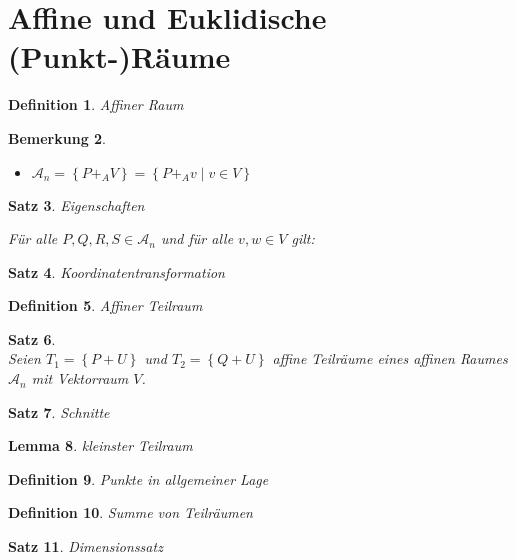 \documentclass[%
a4paper,
11pt,		%
twoside,
]
{scrartcl}
\theoremstyle{plain}
\newtheorem{mydef}{Definition}[section]
\theoremstyle{plain}
\newtheorem{mysatz}[mydef]{Satz}
\theoremstyle{plain}
\newtheorem{mylemma}[mydef]{Lemma}
\theoremstyle{plain}
\newtheorem{mybem}[mydef]{Bemerkung}
\theoremstyle{plain}
\begin{document}


\section{Affine und Euklidische (Punkt-)Räume} %
\label{sec:Affine und Euklidische (Punkt-)Räume}

\begin{mydef}
    Affiner Raum
\end{mydef}

\begin{mybem}
    \begin{itemize}
        \item $\mathcal{A}_n = \left\{ P +_A V \right\} = \left\{ P +_A v \mid v \in V \right\}$
    \end{itemize}
\end{mybem}

\begin{mysatz}
    Eigenschaften

    Für alle $P,Q,R,S \in \mathcal{A}_n$ und  für alle $v,w \in V$ gilt:
\end{mysatz}

\begin{mysatz}
    Koordinatentransformation
\end{mysatz}

\begin{mydef}
    Affiner Teilraum
\end{mydef}

\begin{mysatz}
    \ \\
    Seien $T_1 = \left\{ P+U \right\}$ und $T_2 = \left\{ Q+U \right\}$ affine Teilräume eines affinen Raumes $\mathcal{A}_n$ mit Vektorraum $V$.
\end{mysatz}

\begin{mysatz}
    Schnitte
\end{mysatz}

\begin{mylemma}
    kleinster Teilraum
\end{mylemma}

\begin{mydef}
    Punkte in allgemeiner Lage
\end{mydef}

\begin{mydef}
    Summe von Teilräumen
\end{mydef}

\begin{mysatz}
    Dimensionssatz
\end{mysatz}
\end{document}
